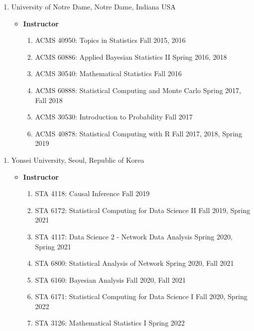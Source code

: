 \documentclass[
]{book}
\providecommand{\tightlist}{%
  \setlength{\itemsep}{0pt}\setlength{\parskip}{0pt}}
\begin{document}
\begin{enumerate}
\def\labelenumi{\arabic{enumi}.}
\setcounter{enumi}{1}
\item
  University of Notre Dame, Notre Dame, Indiana USA

  \begin{itemize}
  \tightlist
  \item
    \textbf{Instructor}

    \begin{enumerate}
    \def\labelenumii{\arabic{enumii}.}
    \tightlist
    \item
      ACMS 40950: Topics in Statistics Fall 2015, 2016
    \item
      ACMS 60886: Applied Bayesian Statistics II Spring 2016, 2018
    \item
      ACMS 30540: Mathematical Statistics Fall 2016
    \item
      ACMS 60888: Statistical Computing and Monte Carlo Spring 2017, Fall 2018
    \item
      ACMS 30530: Introduction to Probability Fall 2017
    \item
      ACMS 40878: Statistical Computing with R Fall 2017, 2018, Spring 2019
    \end{enumerate}
  \end{itemize}
\end{enumerate}

\begin{enumerate}
\def\labelenumi{\arabic{enumi}.}
\setcounter{enumi}{2}
\item
  Yonsei University, Seoul, Republic of Korea

  \begin{itemize}
  \tightlist
  \item
    \textbf{Instructor}

    \begin{enumerate}
    \def\labelenumii{\arabic{enumii}.}
    \tightlist
    \item
      STA 4118: Causal Inference Fall 2019
    \item
      STA 6172: Statistical Computing for Data Science II Fall 2019, Spring 2021
    \item
      STA 4117: Data Science 2 - Network Data Analysis Spring 2020, Spring 2021
    \item
      STA 6800: Statistical Analysis of Network Spring 2020, Fall 2021
    \item
      STA 6160: Bayesian Analysis Fall 2020, Fall 2021
    \item
      STA 6171: Statistical Computing for Data Science I Fall 2020, Spring 2022
    \item
      STA 3126: Mathematical Statistics I Spring 2022
    \end{enumerate}
  \end{itemize}
\end{enumerate}
\end{document}
